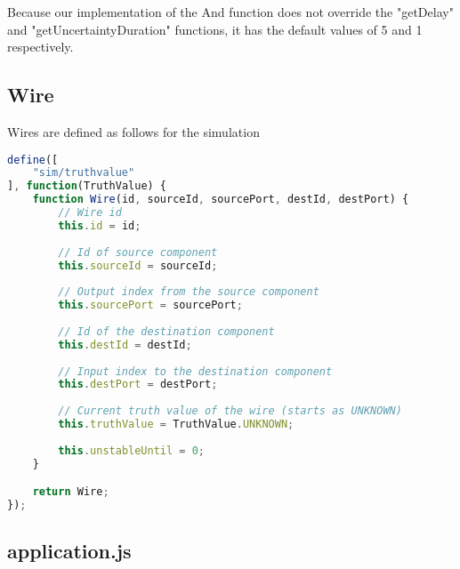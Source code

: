 Because our implementation of the And function does not override the "getDelay" and "getUncertaintyDuration" functions, it has the default values of 5 and 1 respectively.

\subsection{Wire}
Wires are defined as follows for the simulation

\begin{lstlisting}[language=JavaScript]
define([
    "sim/truthvalue"
], function(TruthValue) {
    function Wire(id, sourceId, sourcePort, destId, destPort) {
		// Wire id    
        this.id = id;
        
        // Id of source component
        this.sourceId = sourceId;
        
        // Output index from the source component
        this.sourcePort = sourcePort;
        
        // Id of the destination component
        this.destId = destId;
        
        // Input index to the destination component
        this.destPort = destPort;
        
        // Current truth value of the wire (starts as UNKNOWN)
        this.truthValue = TruthValue.UNKNOWN;
        
        this.unstableUntil = 0;
    }

    return Wire;
});
\end{lstlisting}

\subsection{application.js}